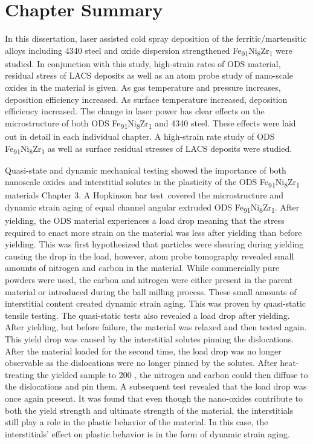 
\section*{Chapter Summary}

	In this dissertation, laser assisted cold spray deposition of the ferritic/martensitic alloys including 4340 steel and oxide dispersion strengthened Fe\textsubscript{91}Ni\textsubscript{8}Zr\textsubscript{1} were studied. In conjunction with this study, high-strain rates of ODS material, residual stress of LACS deposits as well as an atom probe study of nano-scale oxides in the material is given. As gas temperature and pressure increases, deposition efficiency increased. As surface temperature increased, deposition efficiency increased. The change in laser power has clear effects on the microstructure of both ODS Fe\textsubscript{91}Ni\textsubscript{8}Zr\textsubscript{1} and 4340 steel. These effects were laid out in detail in each individual chapter. A high-strain rate study of ODS Fe\textsubscript{91}Ni\textsubscript{8}Zr\textsubscript{1} as well as surface residual stresses of LACS deposits were studied.
	
	Quasi-state and dynamic mechanical testing showed the importance of both nanoscale oxides and interstitial solutes in the plasticity of the ODS Fe\textsubscript{91}Ni\textsubscript{8}Zr\textsubscript{1} materials Chapter 3. A Hopkinson bar test\   covered the microstructure and dynamic strain aging of equal channel angular extruded ODS Fe\textsubscript{91}Ni\textsubscript{8}Zr\textsubscript{1}. After yielding, the ODS material experiences a load drop meaning that the stress required to enact more strain on the material was less after yielding than before yielding. This was first hypothesized that particles were shearing during yielding causing the drop in the load, however, atom probe tomography revealed small amounts of nitrogen and carbon in the material. While commercially pure powders were used, the carbon and nitrogen were either present in the parent material or introduced during the ball milling process. These small amounts of interstitial content created dynamic strain aging. This was proven by quasi-static tensile testing. The quasi-static tests also revealed a load drop after yielding. After yielding, but before failure, the material was relaxed and then tested again. This yield drop was caused by the interstitial solutes pinning the dislocations. After the material loaded for the second time, the load drop was no longer observable as the dislocations were no longer pinned by the solutes. After heat-treating the yielded sample to 200 \celsius{}, the nitrogen and carbon could then diffuse to the dislocations and pin them. A subsequent test revealed that the load drop was once again present. It was found that even though the nano-oxides contribute to both the yield strength and ultimate strength of the material, the interstitials still play a role in the plastic behavior of the material. In this case, the interstitials’ effect on plastic behavior is in the form of dynamic strain aging.
	
